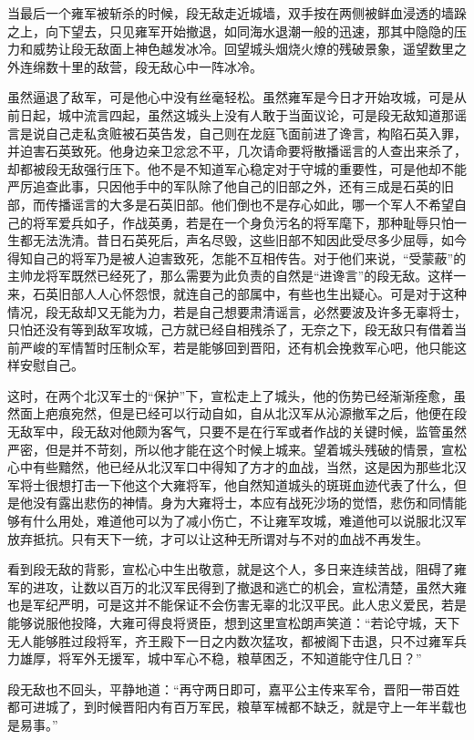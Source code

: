 当最后一个雍军被斩杀的时候，段无敌走近城墙，双手按在两侧被鲜血浸透的墙跺之上，向下望去，只见雍军开始撤退，如同海水退潮一般的迅速，那其中隐隐的压力和威势让段无敌面上神色越发冰冷。回望城头烟烧火燎的残破景象，遥望数里之外连绵数十里的敌营，段无敌心中一阵冰冷。

虽然逼退了敌军，可是他心中没有丝毫轻松。虽然雍军是今日才开始攻城，可是从前日起，城中流言四起，虽然这城头上没有人敢于当面议论，可是段无敌知道那谣言是说自己走私贪赃被石英告发，自己则在龙庭飞面前进了谗言，构陷石英入罪，并迫害石英致死。他身边亲卫忿忿不平，几次请命要将散播谣言的人查出来杀了，却都被段无敌强行压下。他不是不知道军心稳定对于守城的重要性，可是他却不能严厉追查此事，只因他手中的军队除了他自己的旧部之外，还有三成是石英的旧部，而传播谣言的大多是石英旧部。他们倒也不是存心如此，哪一个军人不希望自己的将军爱兵如子，作战英勇，若是在一个身负污名的将军麾下，那种耻辱只怕一生都无法洗清。昔日石英死后，声名尽毁，这些旧部不知因此受尽多少屈辱，如今得知自己的将军乃是被人迫害致死，怎能不互相传告。对于他们来说，“受蒙蔽”的主帅龙将军既然已经死了，那么需要为此负责的自然是“进谗言”的段无敌。这样一来，石英旧部人人心怀怨恨，就连自己的部属中，有些也生出疑心。可是对于这种情况，段无敌却又无能为力，若是自己想要肃清谣言，必然要波及许多无辜将士，只怕还没有等到敌军攻城，己方就已经自相残杀了，无奈之下，段无敌只有借着当前严峻的军情暂时压制众军，若是能够回到晋阳，还有机会挽救军心吧，他只能这样安慰自己。

这时，在两个北汉军士的“保护”下，宣松走上了城头，他的伤势已经渐渐痊愈，虽然面上疤痕宛然，但是已经可以行动自如，自从北汉军从沁源撤军之后，他便在段无敌军中，段无敌对他颇为客气，只要不是在行军或者作战的关键时候，监管虽然严密，但是并不苛刻，所以他才能在这个时候上城来。望着城头残破的情景，宣松心中有些黯然，他已经从北汉军口中得知了方才的血战，当然，这是因为那些北汉军将士很想打击一下他这个大雍将军，他自然知道城头的斑斑血迹代表了什么，但是他没有露出悲伤的神情。身为大雍将士，本应有战死沙场的觉悟，悲伤和同情能够有什么用处，难道他可以为了减小伤亡，不让雍军攻城，难道他可以说服北汉军放弃抵抗。只有天下一统，才可以让这种无所谓对与不对的血战不再发生。

看到段无敌的背影，宣松心中生出敬意，就是这个人，多日来连续苦战，阻碍了雍军的进攻，让数以百万的北汉军民得到了撤退和逃亡的机会，宣松清楚，虽然大雍也是军纪严明，可是这并不能保证不会伤害无辜的北汉平民。此人忠义爱民，若是能够说服他投降，大雍可得良将贤臣，想到这里宣松朗声笑道：“若论守城，天下无人能够胜过段将军，齐王殿下一日之内数次猛攻，都被阁下击退，只不过雍军兵力雄厚，将军外无援军，城中军心不稳，粮草困乏，不知道能守住几日？”

段无敌也不回头，平静地道：“再守两日即可，嘉平公主传来军令，晋阳一带百姓都可进城了，到时候晋阳内有百万军民，粮草军械都不缺乏，就是守上一年半载也是易事。”

